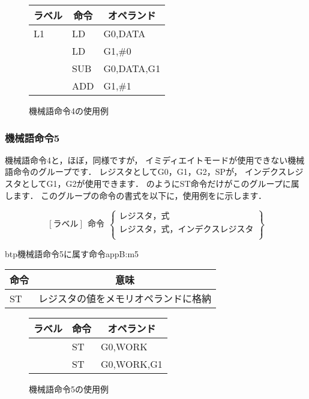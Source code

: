 \begin{figure}[btp]
\begin{center}
{\tt\small\begin{tabular}{|l|l|l|}\hline
\multicolumn{1}{|c|}{ラベル} & 
        \multicolumn{1}{c|}{命令} & \multicolumn{1}{c|}{オペランド} \\\hline
L1  & LD  & G0,DATA \\
    & LD  & G1,\#0 \\
    & SUB & G0,DATA,G1 \\
    & ADD & G1,\#1 \\\hline
\end{tabular}}
\caption{機械語命令4の使用例}
\label{fig:appB:m4ex}
\end{center}
\end{figure}

\subsubsection{機械語命令5}
機械語命令4と，ほぼ，同様ですが，
イミディエイトモードが使用できない機械語命令のグループです．
レジスタとしてG0，G1，G2，SPが，
インデクスレジスタとしてG1，G2が使用できます．
のようにST命令だけがこのグループに属します．
このグループの命令の書式を以下に，使用例をに示します．

{\small\[ %
[ラベル]~~命令~~\left\{
  \begin{array}{c}
   レジスタ，式 \\
   レジスタ，式，インデクスレジスタ \\
  \end{array}  
 \right\}
 \]}

\begin{mytable}{btp}{機械語命令5に属す命令}{appB:m5}
{\small\begin{tabular}{l|l}
\hline\hline
\multicolumn{1}{c|}{命令} & \multicolumn{1}{c}{意味} \\\hline
ST & レジスタの値をメモリオペランドに格納
\end{tabular}}
\end{mytable}

\begin{figure}[btp]
\begin{center}
{\tt\small\begin{tabular}{|l|l|l|}\hline
\multicolumn{1}{|c|}{ラベル} & 
        \multicolumn{1}{c|}{命令} & \multicolumn{1}{c|}{オペランド} \\\hline
  & ST & G0,WORK \\
  & ST & G0,WORK,G1 \\\hline
\end{tabular}}
\caption{機械語命令5の使用例}
\label{fig:appB:m5ex}
\end{center}
\end{figure}

